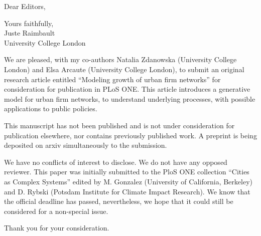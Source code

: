 \documentclass[11pt,a4paper,sans]{moderncv}        %
\begin{document}

\date{September 11th, 2020}
\opening{Dear Editors,}
\closing{Yours faithfully,\\
Juste Raimbault\\
University College London
}
\makelettertitle

\justify
We are pleased, with my co-authors Natalia Zdanowska (University College London) and Elsa Arcaute (University College London), to submit an original research article entitled ``Modeling growth of urban firm networks'' for consideration for publication in PLoS ONE. This article introduces a generative model for urban firm networks, to understand underlying processes, with possible applications to public policies. %

This manuscript has not been published and is not under consideration for publication elsewhere, nor contains previously published work. A preprint is being deposited on arxiv simultaneously to the submission.

We have no conflicts of interest to disclose. We do not have any opposed reviewer. This paper was initially submitted to the PloS ONE collection ``Cities as Complex Systems'' edited by M. Gonzalez (University of California, Berkeley) and D. Rybski (Potsdam Institute for Climate Impact Research). We know that the official deadline has passed, nevertheless, we hope that it could still be considered for a non-special issue.


Thank you for your consideration.
\justify




\makeletterclosing
\end{document}
